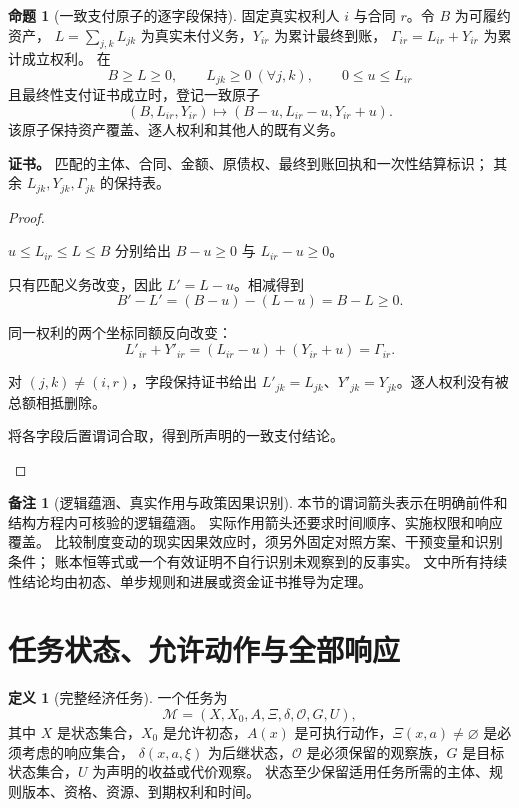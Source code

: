 \documentclass[UTF8,12pt,a4paper,openany,fontset=none,zihao=false]{ctexrep}
\theoremstyle{definition}
\newtheorem{definition}{定义}[chapter]
\newtheorem{proposition}{命题}[chapter]
\newtheorem{remark}{备注}[chapter]
\newenvironment{certificate}{\par\noindent\textbf{证书。}\ignorespaces}{\par}
\newcommand{\1}{\mathbf 1}
\begin{document}
\begin{proposition}[一致支付原子的逐字段保持]
\label{atom:payment}
固定真实权利人 \(i\) 与合同 \(r\)。令 \(B\) 为可履约资产，
\(L=\sum_{j,k}L_{jk}\) 为真实未付义务，\(Y_{ir}\) 为累计最终到账，
\(\Gamma_{ir}=L_{ir}+Y_{ir}\) 为累计成立权利。
在
\[
B\ge L\ge0,\qquad L_{jk}\ge0\ (\forall j,k),\qquad 0\le u\le L_{ir}
\]
且最终性支付证书成立时，登记一致原子
\[
(B,L_{ir},Y_{ir})\mapsto(B-u,L_{ir}-u,Y_{ir}+u).
\]
该原子保持资产覆盖、逐人权利和其他人的既有义务。
\end{proposition}
\begin{certificate}
匹配的主体、合同、金额、原债权、最终到账回执和一次性结算标识；
其余 \(L_{jk},Y_{jk},\Gamma_{jk}\) 的保持表。
\end{certificate}
\begin{proof}
\begin{semanticsteps}
\item \(u\le L_{ir}\le L\le B\) 分别给出
\(B-u\ge0\) 与 \(L_{ir}-u\ge0\)。
\item 只有匹配义务改变，因此 \(L'=L-u\)。相减得到
\[
B'-L'=(B-u)-(L-u)=B-L\ge0.
\]
\item 同一权利的两个坐标同额反向改变：
\[
L'_{ir}+Y'_{ir}=(L_{ir}-u)+(Y_{ir}+u)=\Gamma_{ir}.
\]
\item 对 \((j,k)\ne(i,r)\)，字段保持证书给出
\(L'_{jk}=L_{jk}\)、\(Y'_{jk}=Y_{jk}\)。逐人权利没有被总额相抵删除。
\item 将各字段后置谓词合取，得到所声明的一致支付结论。
\end{semanticsteps}
\end{proof}

\begin{remark}[逻辑蕴涵、真实作用与政策因果识别]
本节的谓词箭头表示在明确前件和结构方程内可核验的逻辑蕴涵。
实际作用箭头还要求时间顺序、实施权限和响应覆盖。
比较制度变动的现实因果效应时，须另外固定对照方案、干预变量和识别条件；
账本恒等式或一个有效证明不自行识别未观察到的反事实。
文中所有持续性结论均由初态、单步规则和进展或资金证书推导为定理。
\end{remark}


\section{任务状态、允许动作与全部响应}

\begin{definition}[完整经济任务]
一个任务为
\[
\mathcal M=(X,X_0,A,\Xi,\delta,\mathcal O,G,U),
\]
其中 \(X\) 是状态集合，\(X_0\) 是允许初态，\(A(x)\) 是可执行动作，\(\Xi(x,a)\ne\varnothing\) 是必须考虑的响应集合，
\(\delta(x,a,\xi)\) 为后继状态，\(\mathcal O\) 是必须保留的观察族，\(G\) 是目标状态集合，\(U\) 为声明的收益或代价观察。
状态至少保留适用任务所需的主体、规则版本、资格、资源、到期权利和时间。
\end{definition}
\end{document}
